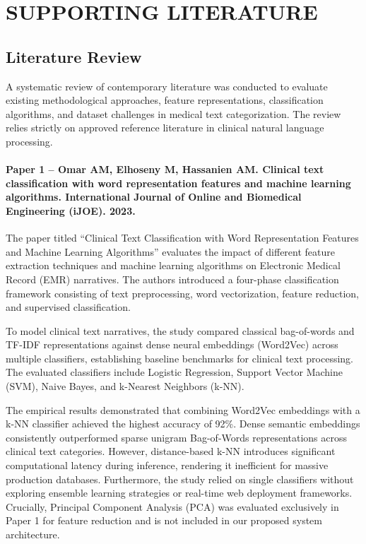 \clearpage

\section{SUPPORTING LITERATURE}

\subsection{Literature Review}
A systematic review of contemporary literature was conducted to evaluate existing methodological approaches, feature representations, classification algorithms, and dataset challenges in medical text categorization. The review relies strictly on approved reference literature in clinical natural language processing.

\paragraph{Paper 1 -- Omar AM, Elhoseny M, Hassanien AM. Clinical text classification with word representation features and machine learning algorithms. International Journal of Online and Biomedical Engineering (iJOE). 2023.}

The paper titled ``Clinical Text Classification with Word Representation Features and Machine Learning Algorithms'' evaluates the impact of different feature extraction techniques and machine learning algorithms on Electronic Medical Record (EMR) narratives. The authors introduced a four-phase classification framework consisting of text preprocessing, word vectorization, feature reduction, and supervised classification.

To model clinical text narratives, the study compared classical bag-of-words and TF-IDF representations against dense neural embeddings (Word2Vec) across multiple classifiers, establishing baseline benchmarks for clinical text processing. The evaluated classifiers include Logistic Regression, Support Vector Machine (SVM), Naive Bayes, and k-Nearest Neighbors (k-NN).

The empirical results demonstrated that combining Word2Vec embeddings with a k-NN classifier achieved the highest accuracy of 92\%. Dense semantic embeddings consistently outperformed sparse unigram Bag-of-Words representations across clinical text categories. However, distance-based k-NN introduces significant computational latency during inference, rendering it inefficient for massive production databases. Furthermore, the study relied on single classifiers without exploring ensemble learning strategies or real-time web deployment frameworks. Crucially, Principal Component Analysis (PCA) was evaluated exclusively in Paper 1 for feature reduction and is not included in our proposed system architecture.


